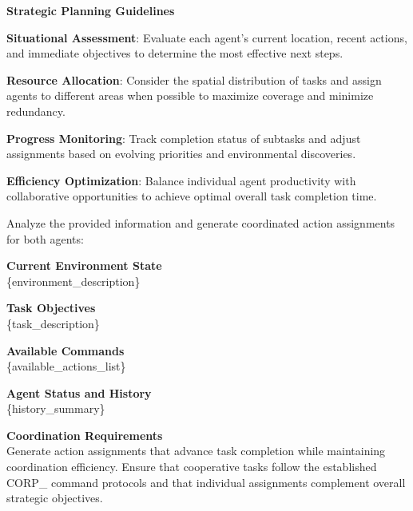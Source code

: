 \begin{tcolorbox}
\begin{flushleft}
\textbf{Strategic Planning Guidelines}

\textbf{Situational Assessment}: Evaluate each agent's current location, recent actions, and immediate objectives to determine the most effective next steps.

\textbf{Resource Allocation}: Consider the spatial distribution of tasks and assign agents to different areas when possible to maximize coverage and minimize redundancy.

\textbf{Progress Monitoring}: Track completion status of subtasks and adjust assignments based on evolving priorities and environmental discoveries.

\textbf{Efficiency Optimization}: Balance individual agent productivity with collaborative opportunities to achieve optimal overall task completion time.
\end{flushleft}
\end{tcolorbox}

\begin{tcolorbox}[
    colback=gray!10!white,
    colframe=black,
    title={User prompt for multi-agent},
    fonttitle=\bfseries\small,
    breakable,
    enhanced,
    left=2mm,
    right=2mm,
    top=2mm,
    bottom=2mm,
    boxsep=1mm,
    arc=0pt,
    fontupper=\small\ttfamily,  %
    before skip=6pt,
    after skip=6pt
]
\begin{flushleft}
Analyze the provided information and generate coordinated action assignments for both agents:

\textbf{Current Environment State}\\
\{environment\_description\}

\textbf{Task Objectives}\\
\{task\_description\}

\textbf{Available Commands}\\
\{available\_actions\_list\}

\textbf{Agent Status and History}\\
\{history\_summary\}

\textbf{Coordination Requirements}\\
Generate action assignments that advance task completion while maintaining coordination efficiency. Ensure that cooperative tasks follow the established CORP\_ command protocols and that individual assignments complement overall strategic objectives.
\end{flushleft}
\end{tcolorbox}